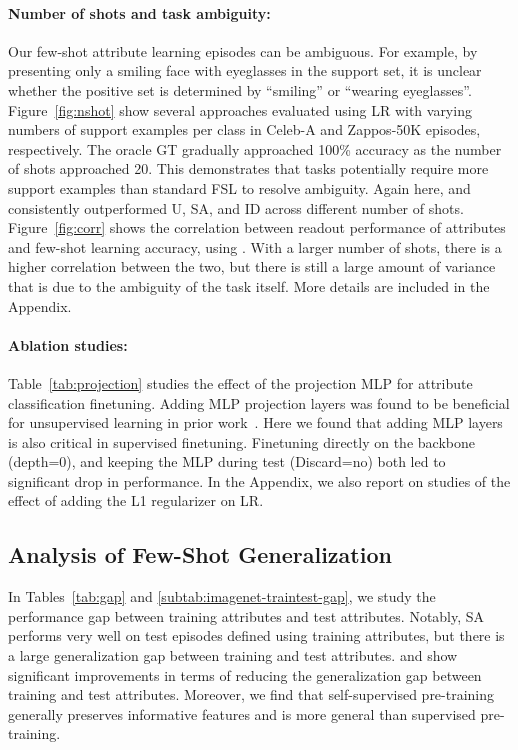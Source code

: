 \paragraph{Number of shots and task ambiguity:} 
Our few-shot attribute learning episodes can be ambiguous. For example, by
presenting only a smiling face with eyeglasses in the support set, it is
unclear whether the positive set is determined by ``smiling'' or ``wearing
eyeglasses''. Figure~\ref{fig:nshot} show several approaches evaluated using LR
with varying numbers of support examples per class in Celeb-A and Zappos-50K
episodes, respectively. The oracle GT gradually approached 100\% accuracy as
the number of shots approached 20. This demonstrates that \taskname{} tasks
potentially require more support examples than standard FSL to resolve
ambiguity. Again here, \uftsa{} and \uftpn{} consistently outperformed U, SA,
and ID across different number of shots. Figure~\ref{fig:corr} shows the
correlation between readout performance of attributes and few-shot learning
accuracy, using \uftsa{}. With a larger number of shots, there is a higher
correlation between the two, but there is still a large amount of variance that
is due to the ambiguity of the task itself. More details are included in the
Appendix.

\savespacebeforesection
\paragraph{Ablation studies:} Table~\ref{tab:projection} studies the effect of
the projection MLP for attribute classification finetuning. Adding MLP
projection layers was found to be beneficial for unsupervised learning in prior
work~\citep{simclr}. Here we found that adding MLP layers is also critical in
supervised finetuning. Finetuning directly on the
backbone (depth=0), and keeping the MLP during test (Discard=no) both led to
significant drop in performance. In the Appendix, we also report on studies of
the effect of adding the L1 regularizer on LR.

\savespacebeforesection
\subsection{Analysis of Few-Shot Generalization}
\label{sec:analysis}
\savespacebeforesection
In Tables~\ref{tab:gap} and \ref{subtab:imagenet-traintest-gap}, we study the
performance gap between training attributes and test attributes. Notably, SA
performs very well on test episodes defined using training attributes, but
there is a large generalization gap between training and test attributes.
\uftpn{} and \uftsa{} show significant improvements in terms of reducing the
generalization gap between training and test attributes. Moreover, we find that
self-supervised pre-training generally preserves informative features and is
more general than supervised pre-training.

